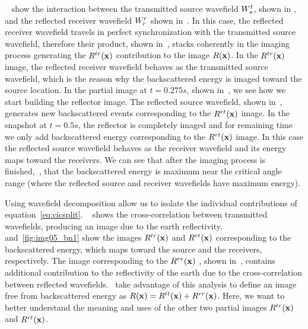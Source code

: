 ~ show the interaction between the transmitted source wavefield ${W_s^t}$, shown in , and 
the reflected receiver wavefield ${W_r^r}$ shown in~. In this case, the reflected receiver wavefield travels in perfect synchronization
with the transmitted source wavefield, therefore their product, shown in~, stacks coherently in the imaging 
process generating the $R^{tr}({\bf x})$ contribution to the image $R({\bf x})$. In the $R^{tr}({\bf x})$ image, the reflected 
receiver wavefield behaves as the transmitted source wavefield, which is the reason why the backscattered energy is imaged toward the source location. 
%
%
 In the partial image at $t=0.275s$, shown in~, we see how we start building the reflector image.
 The reflected source wavefield, shown in~, generates new backscattered events
corresponding to the  $R^{rt}({\bf x})$ image.
%
%
In the snapshot at $t=0.5s$, the reflector is completely imaged and 
 for remaining time we only add backscattered energy corresponding to the $R^{rt}({\bf x})$ image. In this case the 
reflected source wavefield behaves as the receiver wavefield and its energy maps toward the receivers. We can see that after
 the imaging process is finished,~, that the backscattered energy is maximum near the critical
 angle range (where the reflected source and receiver wavefields have maximum energy).

Using wavefield decomposition allow us to isolate the individual contributions of equation~\ref{eq:cicsplit}. 
~ shows the cross-correlation between transmitted wavefields, producing an image due to the
earth reflectivity.~ and~\ref{fig:img05_bn1} show the images $R^{tr}({\bf x})$ and $R^{rt}({\bf x})$ corresponding
to the backscattered energy, which maps toward the source and the receivers, respectively. The image corresponding to the $R^{rr}({\bf x})$ 
, shown in~, contains additional contribution to the reflectivity of the earth due to the cross-correlation
between reflected wavefields.~\cite{fei:3130} take  advantage of this analysis to define an image 
free from backscattered energy as $R({\bf x})=R^{tt}({\bf x})+R^{rr}({\bf x})$. Here,
we want to better understand the meaning and uses of the other two partial images $R^{tr}({\bf x})$ and $R^{rt}({\bf x})$.




